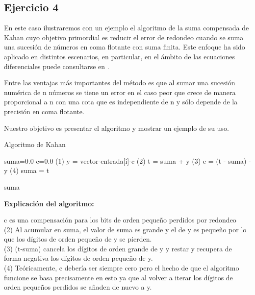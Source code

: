 \documentclass{article}
\theoremstyle{theorem-style}  %
\theoremstyle{definition-style}
\theoremstyle{example-style}
\begin{document}
\subsection{Ejercicio 4} \label{ejtp4}

En este caso ilustraremos con un ejemplo el algoritmo de la suma compensada de Kahan cuyo objetivo primordial es reducir el error de redondeo cuando se suma una sucesión de números en coma flotante con suma finita. Este enfoque ha sido aplicado en distintos escenarios, en particular, en el ámbito de las ecuaciones diferenciales puede consultarse en \cite{Vitasek}.

Entre las ventajas más importantes del método es que al sumar una sucesión numérica de n números se tiene un error en el caso peor que crece de manera proporcional a n con una cota que es independiente de n y sólo depende de la precisión en coma flotante.

Nuestro objetivo es presentar el algoritmo y mostrar un ejemplo de su uso.

    \begin{algorithm}
    	\caption{Algoritmo de Kahan}
    	\label{algo:algo-kahan}
    	\begin{algorithmic}
    		\State suma=0.0
    		\State c=0.0
    		\State (1) y = vector-entrada[i]-c
    		\State (2) t = suma + y
    		\State (3) c = (t - suma) - y
    		\State (4) suma = t
    		\EndFor

    		\Return suma
    		\EndFunction
    	\end{algorithmic}
    \end{algorithm}

\textbf{Explicación del algoritmo:}

c es una compensación para los bits de orden pequeño perdidos por redondeo \\
(2) Al acumular en suma, el valor de suma es grande y el de y es pequeño por lo que los dígitos de orden pequeño de y se pierden. \\
(3) (t-suma) cancela los dígitos de orden grande de y y restar y recupera de forma negativa los dígitos de orden pequeño de y. \\
(4) Teóricamente, c debería ser siempre cero pero el hecho de que el algoritmo funcione se basa precisamente en esto ya que al volver a iterar los dígitos de orden pequeños perdidos se añaden de nuevo a y. \\
\end{document}
